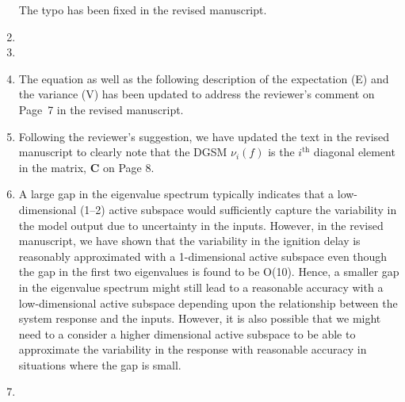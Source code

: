 \documentclass[11pt,final]{article}
\newcommand{\referee}[1]{\vspace{.1ex}\noindent{\textcolor{blue}{#1}}}
\begin{document}
\begin{enumerate}[wide, labelwidth=!, labelindent=0pt]
\noindent  The typo has been fixed in the revised manuscript. 

\item \referee{7.23-27: why 'statistical independence' and not just 'independence'? Is there any other 
type of independence?}

\item \referee{7.29-30: Any PDF can be written in a Boltzmann form, V(x) is just the negative log-PDF, 
I am not sure if it is necessary to bring up a Boltzmann distribution language here.
Also, it could be confused with Maxwell-Boltzmann distribution, which is a very specific PDF form.}


\item \referee{7.40: Explain what E and V are with respect to in Eq (8).}

\noindent  The equation as well as the following description of the expectation (E) and the variance (V)
has been updated to address the reviewer's comment on Page~7 in the revised manuscript. 

\item \referee{7.50: Just say in words that it is the i-th diagonal element of matrix C.}

\noindent Following the reviewer's suggestion, we have updated the text in the revised manuscript to
clearly note that the DGSM $\nu_i(f)$ is the $i^{\text{th}}$ diagonal element in the matrix, $\mathbf{C}$
on Page 8.

\item \referee{10.56: what if there is no eigenvalue gap of O(100)?}

\noindent A large gap in the eigenvalue spectrum typically indicates that a low-dimensional (1--2) active subspace 
would sufficiently capture the variability in the model output due to uncertainty in the inputs. However,
in the revised manuscript, we have shown that the variability in the ignition delay is reasonably
approximated with a 1-dimensional active subspace even though the gap in the first two eigenvalues
is found to be O(10). Hence, a smaller gap in the eigenvalue spectrum might still lead to a reasonable
accuracy with a low-dimensional active subspace depending upon the relationship between the
system response and the inputs. However, it is also possible that we might need to a consider a higher 
dimensional active subspace to be able to approximate the variability in the response with reasonable
accuracy in situations where the gap is small. 

\item \referee{11.33: Alg. 1: should have $\beta$ as input, too?}


\end{enumerate}
\end{document}
